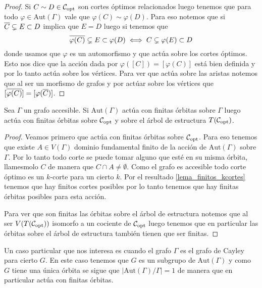 \documentclass[tesis.tex]{subfiles}
\newcommand{\aut}{\text{Aut}}
\begin{document}
\begin{proof}
	Si $C \sim D \in {\cal C}_{\text{opt}}$ son cortes óptimos relacionados luego tenemos que para todo $\varphi \in \aut(\Gamma)$ vale que $\varphi(C) \sim \varphi(D)$.
	Para eso notemos que si $\overline C \subsetneq E \subset D$ implica que $E = D$ luego si tenemos que
	\[
	\overline {\varphi(C)} \subsetneq E \subset \varphi(D) \iff C \subsetneq \varphi(E) \subset D
	\]  
	donde usamos que $\varphi$ es un automorfismo y que actúa sobre los cortes óptimos.
	Esto nos dice que la acción dada por $\varphi([C]) = [\varphi (C)]$ está bien definida y por lo tanto actúa sobre los vértices.
	Para ver que actúa sobre las aristas notemos que al ser un morfismo de grafos y por actúar sobre los vértices que $[\overline{\varphi(C)}] = [\varphi (\overline C)]$.	
\end{proof}


\begin{lema}\label{lema_finitas_orbitas}
	Sea $\Gamma$ un grafo accesible.
	Si $\aut(\Gamma)$ actúa con finitas órbitas sobre $\Gamma$ luego actúa con finitas órbitas sobre ${\cal C}_{\text{opt}}$ y sobre el árbol de estructura $T({\cal C}_{\text{opt}})$.
\end{lema} 
\begin{proof}
	Veamos primero que actúa con finitas órbitas sobre ${\cal C}_{\text{opt}}$.
	Para eso tenemos que existe $A \in V(\Gamma)$ dominio fundamental finito de la acción de $\aut(\Gamma)$ sobre $\Gamma$.
	Por lo tanto todo corte se puede tomar alguno que esté en su misma órbita, llamesmolo $C$ de manera que $C \cap A \neq \emptyset$.
	Como el grafo es accesible todo corte óptimo es un $k$-corte para un cierto $k$.
	Por el resultado \ref{lema_finitos_kcortes} tenemos que hay finitos cortes posibles por lo tanto tenemos que hay finitas órbitas posibles para esta acción.
	
	Para ver que son finitas las órbitas sobre el árbol de estructura notemos que al ser $V(T({\cal C}_{\text{opt}}))$ isomorfo a un cociente de ${\cal C}_{\text{opt}}$ luego tenemos que en particular las órbitas sobre el árbol de estructura también tienen que ser finitas.
\end{proof}

\begin{obs}
	Un caso particular que nos interesa es cuando el grafo $\Gamma$ es el grafo de Cayley para cierto \fg $G$.
	En este caso tenemos que $G$ es un subgrupo de $\aut(\Gamma)$ y como $G$ tiene una única órbita se sigue que $|\aut(\Gamma)/\Gamma| = 1$ de manera que en particular actúa con finitas órbitas.		
\end{obs}
\end{document}
